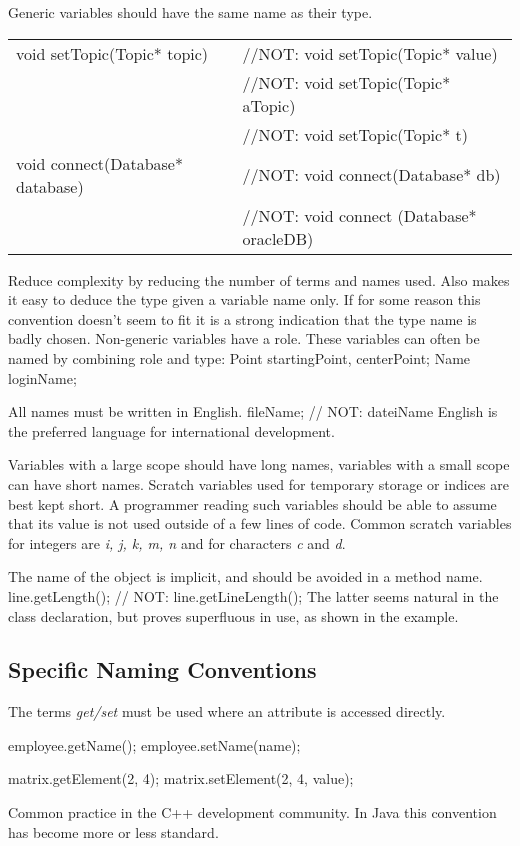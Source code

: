\recommendation
{Generic variables should have the same name as their type.}
{
	\begin{tabularx}{\textwidth}{l l}
	 void setTopic(Topic* topic) &//NOT: void setTopic(Topic* value) \\
	 &//NOT: void setTopic(Topic* aTopic) \\
	 &//NOT: void setTopic(Topic* t) \\
	 void connect(Database* database) &//NOT: void connect(Database* db) \\
	 &//NOT: void connect (Database* oracleDB)
	\end{tabularx}
}
{Reduce complexity by reducing the number of terms and names used. Also makes it easy to deduce the type given a variable name only.\newline
If for some reason this convention doesn't seem to fit it is a strong indication that the type name is badly chosen.\newline
Non-generic variables have a role. These variables can often be named by combining role and type:\newline
Point  startingPoint, centerPoint;\newline
Name   loginName;\newline
}

\recommendation
{All names must be written in English.}
{fileName; // NOT: dateiName}
{English is the preferred language for international development.}

\recommendation
{Variables with a large scope should have long names, variables with a small scope can have short names.}
{}
{Scratch variables used for temporary storage or indices are best kept short. A programmer reading such variables should be able to assume that its value is not used outside of a few lines of code. Common scratch variables for integers are \textit{i, j, k, m, n} and for characters \textit{c} and \textit{d}.}

\recommendation
{The name of the object is implicit, and should be avoided in a method name.}
{line.getLength(); // NOT: line.getLineLength();}
{The latter seems natural in the class declaration, but proves superfluous in use, as shown in the example.}

\subsection{Specific Naming Conventions}

\recommendation
{The terms \textit{get/set} must be used where an attribute is accessed directly.}
{
	employee.getName();\newline
	employee.setName(name);\newline
	
	matrix.getElement(2, 4);\newline
	matrix.setElement(2, 4, value);
}
{Common practice in the C++ development community. In Java this convention has become more or less standard.}

